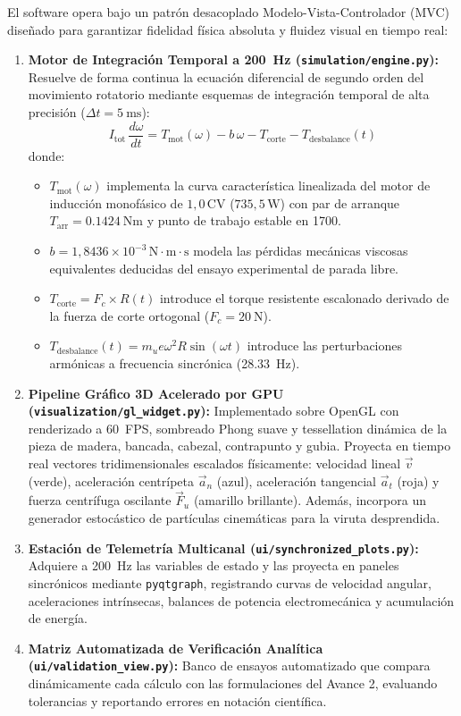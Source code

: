 El software opera bajo un patrón desacoplado Modelo-Vista-Controlador (MVC) diseñado para garantizar fidelidad física absoluta y fluidez visual en tiempo real:
\begin{enumerate}[leftmargin=18pt, itemsep=4pt]
    \item \textbf{Motor de Integración Temporal a \SI{200}{\hertz} (\texttt{simulation/engine.py}):} Resuelve de forma continua la ecuación diferencial de segundo orden del movimiento rotatorio mediante esquemas de integración temporal de alta precisión ($\Delta t = \SI{5}{\milli\second}$):
    \begin{equation}
        I_{\text{tot}}\,\frac{d\omega}{dt} = T_{\text{mot}}(\omega) - b\,\omega - T_{\text{corte}} - T_{\text{desbalance}}(t)
    \end{equation}
    donde:
    \begin{itemize}[itemsep=2pt]
        \item $T_{\text{mot}}(\omega)$ implementa la curva característica linealizada del motor de inducción monofásico de $1{,}0\,\text{CV}$ ($735{,}5\,\text{W}$) con par de arranque $T_{\text{arr}} = \SI{0,1424}{\newton\meter}$ y punto de trabajo estable en \SI{1700}{\rpm}.
        \item $b = 1{,}8436 \times 10^{-3}\,\text{N}\cdot\text{m}\cdot\text{s}$ modela las pérdidas mecánicas viscosas equivalentes deducidas del ensayo experimental de parada libre.
        \item $T_{\text{corte}} = F_c \times R(t)$ introduce el torque resistente escalonado derivado de la fuerza de corte ortogonal ($F_c = \SI{20}{\newton}$).
        \item $T_{\text{desbalance}}(t) = m_u e \omega^2 R \sin(\omega t)$ introduce las perturbaciones armónicas a frecuencia sincrónica (\SI{28,33}{\hertz}).
    \end{itemize}
    \item \textbf{Pipeline Gráfico 3D Acelerado por GPU (\texttt{visualization/gl\_widget.py}):} Implementado sobre OpenGL con renderizado a \SI{60}{FPS}, sombreado Phong suave y tessellation dinámica de la pieza de madera, bancada, cabezal, contrapunto y gubia. Proyecta en tiempo real vectores tridimensionales escalados físicamente: velocidad lineal $\vec{v}$ (verde), aceleración centrípeta $\vec{a}_n$ (azul), aceleración tangencial $\vec{a}_t$ (roja) y fuerza centrífuga oscilante $\vec{F}_u$ (amarillo brillante). Además, incorpora un generador estocástico de partículas cinemáticas para la viruta desprendida.
    \item \textbf{Estación de Telemetría Multicanal (\texttt{ui/synchronized\_plots.py}):} Adquiere a \SI{200}{\hertz} las variables de estado y las proyecta en paneles sincrónicos mediante \texttt{pyqtgraph}, registrando curvas de velocidad angular, aceleraciones intrínsecas, balances de potencia electromecánica y acumulación de energía.
    \item \textbf{Matriz Automatizada de Verificación Analítica (\texttt{ui/validation\_view.py}):} Banco de ensayos automatizado que compara dinámicamente cada cálculo con las formulaciones del Avance 2, evaluando tolerancias y reportando errores en notación científica.
\end{enumerate}

